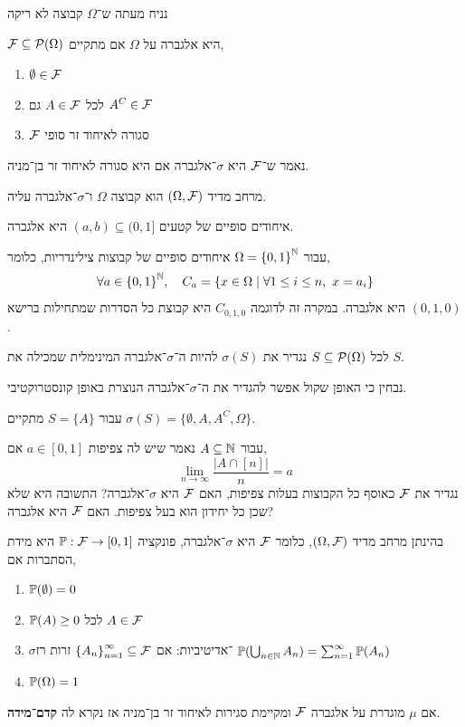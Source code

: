 נניח מעתה ש־$\Omega$ קבוצה לא ריקה
\begin{definition}[אלגברה]
	$\mathcal{F} \subseteq \mathcal{P}(\Omega)$ היא אלגברה על $\Omega$ אם מתקיים,
	\begin{enumerate}
		\item $\emptyset \in \mathcal{F}$
		\item לכל $A \in \mathcal{F}$ גם $A^C \in \mathcal{F}$
		\item $\mathcal{F}$ סגורה לאיחוד זר סופי
	\end{enumerate}
	נאמר ש־$\mathcal{F}$ היא $\sigma$־אלגברה אם היא סגורה לאיחוד זר בן־מניה.
\end{definition}
\begin{definition}
	מרחב מדיד $(\Omega, \mathcal{F})$ הוא קבוצה $\Omega$ ו־$\sigma$־אלגברה עליה.
\end{definition}
\begin{example}
	איחודים סופיים של קטעים $(a, b) \subseteq (0, 1]$ היא אלגברה.
\end{example}
\begin{example}
	עבור $\Omega = {\{0, 1\}}^{\mathbb{N}}$ איחודים סופיים של קבוצות צילינדריות, כלומר,
	\[
		\forall a \in {\{ 0, 1 \}}^{\mathbb{N}},
		\quad
		C_a
		= \{ x \in \Omega \mid \forall 1 \le i \le n,\ x = a_i \}
	\]
	היא אלגברה.
	במקרה זה לדוגמה $C_{0, 1, 0}$ היא קבוצת כל הסדרות שמתחילות ברישא $(0, 1, 0)$.
\end{example}
\begin{definition}
	לכל $S \subseteq \mathcal{P}(\Omega)$ נגדיר את $\sigma(S)$ להיות ה־$\sigma$־אלגברה המינימלית שמכילה את $S$.
\end{definition}
נבחין כי האופן שקול אפשר להגדיר את ה־$\sigma$־אלגברה הנוצרת באופן קונסטרוקטיבי.
\begin{example}
	עבור $S = \{ A \}$ מתקיים $\sigma(S) = \{ \emptyset, A, A^C, \Omega \}$.
\end{example}
\begin{example}
	עבור $A \subseteq \mathbb{N}$ נאמר שיש לה צפיפות $a \in [0, 1]$ אם,
	\[
		\lim_{n \to \infty} \frac{|A \cap [n]|}{n}
		= a
	\]
	נגדיר את $\mathcal{F}$ כאוסף כל הקבוצות בעלות צפיפות, האם $\mathcal{F}$ היא $\sigma$־אלגברה?
	התשובה היא שלא שכן כל יחידון הוא בעל צפיפות.
	האם $\mathcal{F}$ היא אלגברה?
\end{example}
\begin{definition}
	בהינתן מרחב מדיד $(\Omega, \mathcal{F})$, כלומר $\mathcal{F}$ היא $\sigma$־אלגברה,
	פונקציה $\mathbb{P} : \mathcal{F} \to [0, 1]$ היא מידת הסתברות אם,
	\begin{enumerate}
		\item $\mathbb{P}(\emptyset) = 0$
		\item $\mathbb{P}(A) \ge 0$ לכל $A \in \mathcal{F}$
		\item $\sigma$־אדיטיביות: אם ${\{ A_n \}}_{n = 1}^{\infty} \subseteq \mathcal{F}$ זרות רז $\mathbb{P}(\bigcup_{n \in \mathbb{N}} A_n) = \sum_{n = 1}^\infty \mathbb{P}(A_n)$
		\item $\mathbb{P}(\Omega) = 1$
	\end{enumerate}
	אם $\mu$ מוגדרת על אלגברה $\mathcal{F}$ ומקיימת סגירות לאיחוד זר בן־מניה אז נקרא לה \textbf{קדם־מידה}.
\end{definition}
